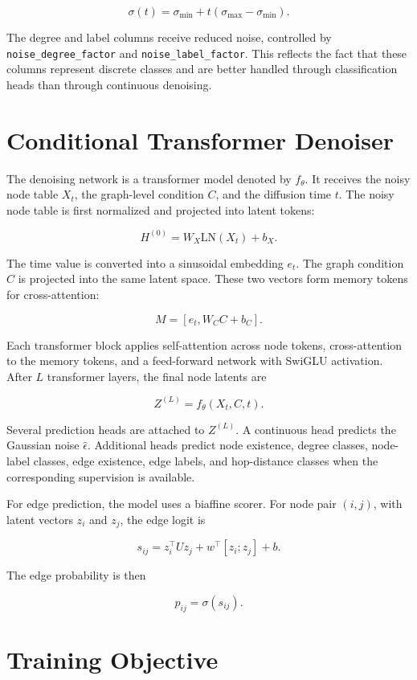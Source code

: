 \[
\sigma(t) = \sigma_{\min} + t(\sigma_{\max}-\sigma_{\min}).
\]

The degree and label columns receive reduced noise, controlled by
\texttt{noise\_degree\_factor} and \texttt{noise\_label\_factor}. This reflects
the fact that these columns represent discrete classes and are better handled
through classification heads than through continuous denoising.

\section{Conditional Transformer Denoiser}
\label{sec:generator:architecture}

The denoising network is a transformer model denoted by \(f_\theta\). It receives
the noisy node table \(X_t\), the graph-level condition \(C\), and the diffusion
time \(t\). The noisy node table is first normalized and projected into latent
tokens:

\[
H^{(0)} = W_X \mathrm{LN}(X_t) + b_X.
\]

The time value is converted into a sinusoidal embedding \(e_t\). The graph
condition \(C\) is projected into the same latent space. These two vectors form
memory tokens for cross-attention:

\[
M = [e_t, W_C C + b_C].
\]

Each transformer block applies self-attention across node tokens, cross-attention
to the memory tokens, and a feed-forward network with SwiGLU activation. After
\(L\) transformer layers, the final node latents are

\[
Z^{(L)} = f_\theta(X_t, C, t).
\]

Several prediction heads are attached to \(Z^{(L)}\). A continuous head predicts
the Gaussian noise \(\hat{\epsilon}\). Additional heads predict node existence,
degree classes, node-label classes, edge existence, edge labels, and hop-distance
classes when the corresponding supervision is available.

For edge prediction, the model uses a biaffine scorer. For node pair \((i,j)\),
with latent vectors \(z_i\) and \(z_j\), the edge logit is

\[
s_{ij} = z_i^\top U z_j + w^\top [z_i;z_j] + b.
\]

The edge probability is then

\[
p_{ij} = \sigma(s_{ij}).
\]

\section{Training Objective}
\label{sec:generator:training}

